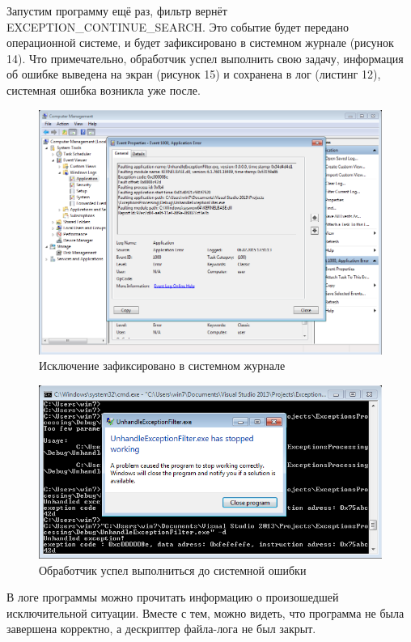 \documentclass[a4paper, 12pt]{report}		%
\begin{document}
Запустим программу ещё раз,  фильтр вернёт EXCEPTION\_CONTINUE\_SEARCH. Это событие будет передано операционной системе, и будет зафиксировано в системном журнале (рисунок 14). Что примечательно, обработчик успел выполнить свою задачу, информация об ошибке выведена на экран (рисунок 15) и сохранена в лог (листинг 12), системная ошибка возникла уже после.
\newpage

\begin{figure}[h!]
\centering
\includegraphics[scale=0.63]{res/007}
\caption{Исключение зафиксировано в системном журнале}
\end{figure}

\begin{figure}[h!]
\centering
\includegraphics[scale=0.8]{res/008}
\caption{Обработчик успел выполниться до системной ошибки}
\end{figure}

В логе программы можно прочитать информацию о произошедшей исключительной ситуации. Вместе с тем, можно видеть, что программа не была завершена корректно, а дескриптер файла-лога не был закрыт.
\end{document}
